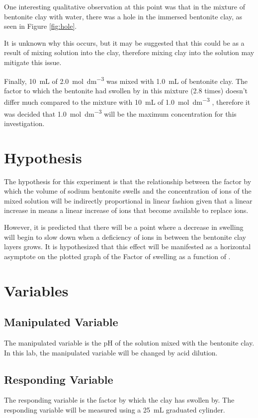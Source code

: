 \documentclass[11pt, letterpaper]{article}
\begin{document}
One interesting qualitative observation at this point was that
in the mixture of bentonite clay with water, there was a hole
in the immersed bentonite clay, as seen in Figure \ref*{fig:hole}.

It is unknown why this occurs, but it may be suggested that
this could be as a result of mixing solution into the clay,
therefore mixing clay into the solution may mitigate this issue.

Finally, \SI{10}{mL} of \SI{2.0}{mol.dm^{-3}} was mixed with \SI{1.0}{mL}
of bentonite clay. The factor to which the bentonite had swollen by
in this mixture (2.8 times) doesn't differ much compared to the
mixture with \SI{10}{mL} of \SI{1.0}{mol.dm^{-3}} , therefore
it was decided that \SI{1.0}{mol.dm^{-3}} will be the maximum
concentration for this investigation.

\section{Hypothesis}

The hypothesis for this experiment is that the relationship between
the factor by which the volume of
sodium bentonite swells and the concentration of  ions of the mixed
solution will be indirectly proportional in linear fashion
given that a linear increase in \ce{[H+]} means a linear increase
of  ions that become available to replace  ions.

However, it is predicted that there will be a point where
a decrease in swelling will begin to slow down when a deficiency
of  ions in between the bentonite clay layers grows.
It is hypothesized that this effect will be manifested
as a horizontal asymptote on the plotted graph of the Factor
of swelling as a function of \ce{[H+]}.

\section{Variables}

\subsection{Manipulated Variable}
The manipulated variable is the pH of the solution mixed with the
bentonite clay. In this lab, the manipulated variable will be
changed by acid dilution.

\subsection{Responding Variable}
The responding variable is the factor by which the clay has swollen by.
The responding variable will be measured using a \SI{25}{mL} graduated cylinder.
\end{document}
